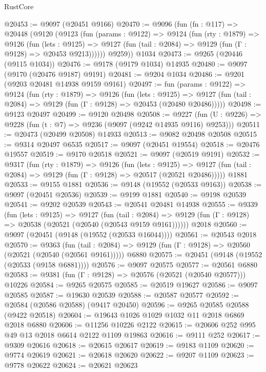\begin{lexlean}{RustCore}
\begin{coremodule}
@20453 := @9097 (@20451 @9166)
@20470 := @9096
    (fun (fn : @117) =>
    @20448
      (@9120
        (@9123
          (fun (params : @9122) =>
          @9124
            (fun (rty : @1879) =>
            @9126
              (fun (lets : @9125) =>
              @9127 (fun (tail : @2084) => @9129 (fun (Γ : @9128) => @20453 @9213))))))
        @9259))
    @1034
@20473 := @9265 (@20446 (@9115 @1034))
@20476 := @9178 (@9179 @1034) @14935
@20480 := @9097 (@9170 (@20476 @9187) @9191)
@20481 := @9204 @1034
@20486 := @9201 (@9203 @20481 @14938 @9159 @9161)
@20497 := fun (params : @9122) =>
  @9124
    (fun (rty : @1879) =>
    @9126
      (fun (lets : @9125) =>
      @9127 (fun (tail : @2084) => @9129 (fun (Γ : @9128) => @20453 (@20480 @20486)))))
@20498 := @9123 @20497
@20499 := @9120 @20498
@20508 := @9227
    (fun (U : @9226) => @9228 (fun (t : @7) => @9236 (@9097 (@9242 @14935 @9116) @9253)))
@20511 := @20473 (@20499 @20508) @14933
@20513 := @9082 @20498 @20508
@20515 := @9314 @20497 @6535
@20517 := @9097 (@20451 @19554)
@20518 := @20476 @19557
@20519 := @9170 @20518
@20521 := @9097 (@20519 @9191)
@20532 := @9317
    (fun (rty : @1879) =>
    @9126
      (fun (lets : @9125) =>
      @9127 (fun (tail : @2084) => @9129 (fun (Γ : @9128) => @20517 (@20521 @20486)))))
    @1881
@20533 := @9155 @1881
@20536 := @9148 (@19552 (@20533 @9163))
@20538 := @9097 (@20451 @20536)
@20539 := @9199 @1881
@20540 := @9198 @20539
@20541 := @9202 @20539
@20543 := @20541 @20481 @14938
@20555 := @9339
    (fun (lets : @9125) =>
    @9127
      (fun (tail : @2084) =>
      @9129 (fun (Γ : @9128) => @20538 (@20521 (@20540 (@20543 @9159 @9161))))))
    @2018
@20560 := @9097 (@20451 (@9148 (@19552 (@20533 @16044))))
@20561 := @20543 @2018
@20570 := @9363
    (fun (tail : @2084) => @9129 (fun (Γ : @9128) => @20560 (@20521 (@20540 (@20561 @9161)))))
    @6880
@20575 := @20451 (@9148 (@19552 (@20533 (@9158 @6881))))
@20576 := @9097 @20575
@20577 := @20561 @6880
@20583 := @9381 (fun (Γ : @9128) => @20576 (@20521 (@20540 @20577))) @10226
@20584 := @9265 @20575
@20585 := @20519 @19627
@20586 := @9097 @20585
@20587 := @19630 @20539
@20588 := @20587 @20577
@20592 := @20584 (@20586 @20588) (@9417 @20450)
@20596 := @9265 @20585 @20588 (@9422 @20518)
@20604 := @19643 @1026 @1029 @1032 @11 @2018 @6869 @2018 @6880
@20606 := @11256 @10226 @2122
@20615 := @20606 @252 @995 @49 @13 @2018 @6614 @2122 @1109 @19863
@20616 := @9111 @252
@20617 := @9309 @20616
@20618 := @20615 @20617
@20619 := @9183 @1109
@20620 := @9774 @20619
@20621 := @20618 @20620
@20622 := @9207 @1109
@20623 := @9778 @20622
@20624 := @20621 @20623

\end{coremodule}
\end{lexlean}
